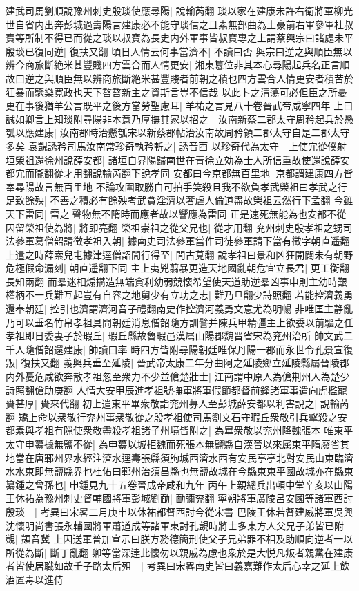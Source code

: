建武司馬劉順說豫州刺史殷琰使應尋陽|{
	說輸芮翻}
琰以家在建康未許右衛將軍柳光世自省内出奔彭城過壽陽言建康必不能守琰信之且素無部曲為土豪前右軍參軍杜叔寶等所制不得已而從之琰以叔寶為長史内外軍事皆叔寶專之上謂蔡興宗曰諸處未平殷琰已復同逆|{
	復扶又翻}
頃日人情云何事當濟不|{
	不讀曰否}
興宗曰逆之與順臣無以辨今商旅斷絶米甚豐賤四方雲合而人情更安|{
	湘東簒位非其本心尋陽起兵名正言順故曰逆之與順臣無以辨商旅斷絶米甚豐賤者前朝之積也四方雲合人情更安者積苦於狂暴而驟樂寛政也天下嗸嗸新主之資斯言豈不信哉}
以此卜之清蕩可必但臣之所憂更在事後猶羊公言既平之後方當勞聖慮耳|{
	羊祐之言見八十卷晉武帝咸寧四年}
上曰誠如卿言上知琰附尋陽非本意乃厚撫其家以招之　汝南新蔡二郡太守周矜起兵於懸瓠以應建康|{
	汝南郡時治懸瓠宋以新蔡郡帖治汝南故周矜領二郡太守自是二郡太守多矣}
袁覬誘矜司馬汝南常珍奇執矜斬之|{
	誘音酉}
以珍奇代為太守　上使宂從僕射垣榮祖還徐州說薛安都|{
	諸垣自界陽歸南世在青徐立効為士人所信重故使還說薛安都宂而隴翻從才用翻說輸芮翻下說孝同}
安都曰今京都無百里地|{
	京都謂建康四方皆奉尋陽故言無百里地}
不論攻圍取勝自可拍手笑殺且我不欲負孝武榮祖曰孝武之行足致餘殃|{
	不善之積必有餘殃考武貪淫濟以奢虐人倫道盡故榮祖云然行下孟翻}
今雖天下雷同|{
	雷之聲物無不隋時而應者故以響應為雷同}
正是速死無能為也安都不從因留榮祖使為將|{
	將即亮翻}
榮祖崇祖之從父兄也|{
	從才用翻}
兖州刺史殷孝祖之甥司法參軍葛僧韶請徵孝祖入朝|{
	據南史司法參軍當作司徒參軍請下當有徵字朝直遥翻}
上遣之時薛索兒屯據津逕僧韶間行得至|{
	間古莧翻}
說孝祖曰景和凶狂開闢未有朝野危極假命漏刻|{
	朝直遥翻下同}
主上夷兇翦暴更造天地國亂朝危宜立長君|{
	更工衡翻長知兩翻}
而羣迷相煽搆造無端貪利幼弱競懷希望使天道助逆羣凶事申則主幼時艱權柄不一兵難互起豈有自容之地舅少有立功之志|{
	難乃旦翻少詩照翻}
若能控濟義勇還奉朝廷|{
	控引也濟謂濟河音子禮翻南史作控濟河義勇文意尤為明暢}
非唯匡主静亂乃可以垂名竹帛孝祖具問朝廷消息僧韶隨方訓譬并陳兵甲精彊主上欲委以前驅之任孝祖即日委妻子於瑕丘|{
	瑕丘縣故魯瑕邑漢属山陽郡魏晋省宋為兖州治所}
帥文武二千人隨僧韶還建康|{
	帥讀曰率}
時四方皆附尋陽朝廷唯保丹陽一郡而永世令孔景宣復叛|{
	復扶又翻}
義興兵垂至延陵|{
	晉武帝太康二年分曲阿之延陵鄉立延陵縣屬晉陵郡}
内外憂危咸欲奔散孝祖忽至衆力不少並傖楚壯士|{
	江南謂中原人為傖荆州人為楚少詩照翻傖助庚翻}
人情大安甲辰進孝祖號撫軍將軍假節都督前鋒諸軍事遣向虎檻寵賚甚厚|{
	賚來代翻}
初上遣東平畢衆敬詣兖州募人至彭城薛安都以利害說之|{
	說輸芮翻}
矯上命以衆敬行兖州事衆敬從之殷孝祖使司馬劉文石守瑕丘衆敬引兵擊殺之安都素與孝祖有隙使衆敬盡殺孝祖諸子州境皆附之|{
	為畢衆敬以兖州降魏張本}
唯東平太守申纂據無鹽不從|{
	為申纂以城拒魏而死張本無鹽縣自漢晉以來属東平隋廢省其地當在唐鄆州界水經注濟水逕壽張縣須朐城西濟水西有安民亭亭北對安民山東臨濟水水東即無鹽縣界也杜佑曰鄆州治須昌縣也無鹽故城在今縣東東平國故城亦在縣東}
纂鍾之曾孫也|{
	申鍾見九十五卷晉成帝咸和九年}
丙午上親總兵出頓中堂辛亥以山陽王休祐為豫州刺史督輔國將軍彭城劉勔|{
	勔彌兖翻}
寧朔將軍廣陵呂安國等諸軍西討殷琰　|{
	考異曰宋畧二月庚申以休祐都督西討今從宋書}
巴陵王休若督建威將軍吳興沈懷明尚書張永輔國將軍蕭道成等諸軍東討孔覬時將士多東方人父兄子弟皆已附覬|{
	顗音冀}
上因送軍普加宣示曰朕方務德簡刑使父子兄弟罪不相及助順向逆者一以所從為斷|{
	斷丁亂翻}
卿等當深逹此懷勿以親戚為慮也衆於是大悦凡叛者親黨在建康者皆使居職如故壬子路太后殂　|{
	考異曰宋畧南史皆曰義嘉難作太后心幸之延上飲酒置毒以進侍}


